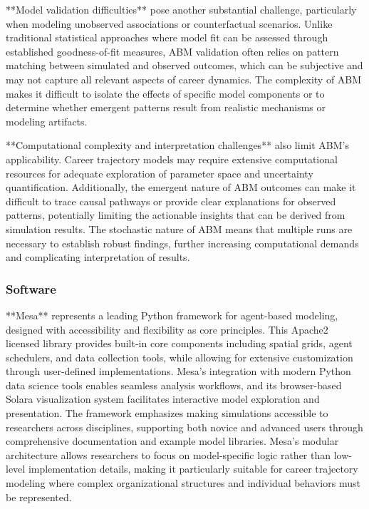 \documentclass[main.tex]{subfiles}
\begin{document}
**Model validation difficulties** pose another substantial challenge, particularly when modeling unobserved associations or counterfactual scenarios\parencite{columbia_abm}. Unlike traditional statistical approaches where model fit can be assessed through established goodness-of-fit measures, ABM validation often relies on pattern matching between simulated and observed outcomes, which can be subjective and may not capture all relevant aspects of career dynamics\parencite{columbia_abm,wikipedia_abm}. The complexity of ABM makes it difficult to isolate the effects of specific model components or to determine whether emergent patterns result from realistic mechanisms or modeling artifacts.

**Computational complexity and interpretation challenges** also limit ABM's applicability\parencite{wikipedia_abm}. Career trajectory models may require extensive computational resources for adequate exploration of parameter space and uncertainty quantification. Additionally, the emergent nature of ABM outcomes can make it difficult to trace causal pathways or provide clear explanations for observed patterns, potentially limiting the actionable insights that can be derived from simulation results. The stochastic nature of ABM means that multiple runs are necessary to establish robust findings, further increasing computational demands and complicating interpretation of results\parencite{columbia_abm,graduate_attrition}.

\subsubsection{Software}

**Mesa** represents a leading Python framework for agent-based modeling, designed with accessibility and flexibility as core principles\parencite{mesa_python}. This Apache2 licensed library provides built-in core components including spatial grids, agent schedulers, and data collection tools, while allowing for extensive customization through user-defined implementations. Mesa's integration with modern Python data science tools enables seamless analysis workflows, and its browser-based Solara visualization system facilitates interactive model exploration and presentation. The framework emphasizes making simulations accessible to researchers across disciplines, supporting both novice and advanced users through comprehensive documentation and example model libraries. Mesa's modular architecture allows researchers to focus on model-specific logic rather than low-level implementation details, making it particularly suitable for career trajectory modeling where complex organizational structures and individual behaviors must be represented.
\end{document}
